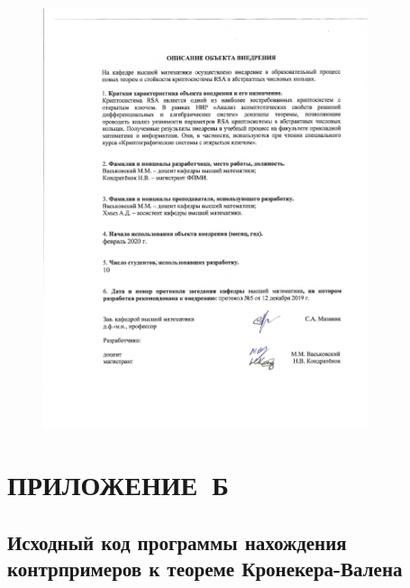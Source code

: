 \documentclass[_00_dissertation.tex]{subfiles}
\begin{document}
\begin{figure}[ht!]
    \centering
    \includegraphics[width=0.85\textwidth]{../additional/Act_KondratyonokNV_page-0002.jpg}
\end{figure}

\chapter*{\hfill ПРИЛОЖЕНИЕ~Б}
\section*{Исходный код программы нахождения контрпримеров к теореме Кронекера-Валена}\label{section:Appendix_code}



\onlyinsubfile{
    
}
\end{document}
